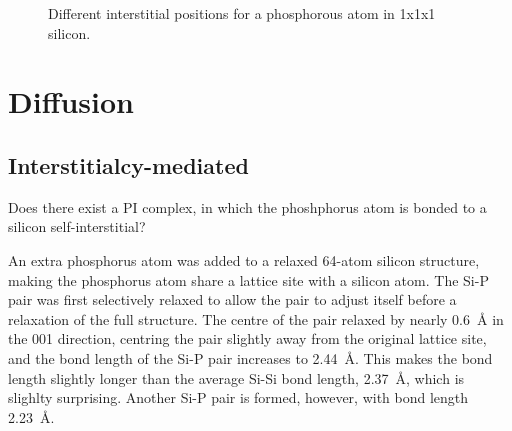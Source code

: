 \documentclass[11pt,bibliography=totoc,index=totoc]{scrbook}   %
\begin{document}
\begin{figure}[htbp]
  \centering
  \caption{Different interstitial positions for a phosphorous atom in 1x1x1 silicon.}
\end{figure}

\section{Diffusion}

\subsection{Interstitialcy-mediated}

Does there exist a PI complex, in which the phoshphorus atom is bonded to a silicon self-interstitial?

An extra phosphorus atom was added to a relaxed 64-atom silicon structure, making the phosphorus atom share a lattice site with a silicon atom.
The Si-P pair was first selectively relaxed to allow the pair to adjust itself before a relaxation of the full structure.
The centre of the pair relaxed by nearly \SI{0.6}{\angstrom} in the 001 direction, centring the pair slightly away from the original lattice site, and the bond length of the Si-P pair increases to \SI{2.44}{\angstrom}. This makes the bond length slightly longer than the average Si-Si bond length, \SI{2.37}{\angstrom}, which is slighlty surprising. Another Si-P pair is formed, however, with bond length \SI{2.23}{\angstrom}.
\end{document}
